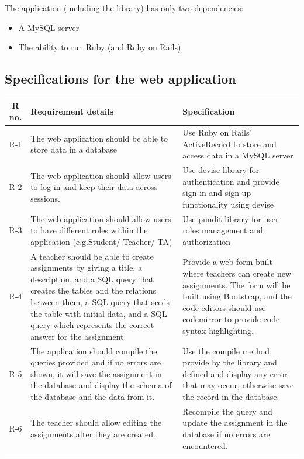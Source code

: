 The application (including the library) has only two dependencies:
\begin{itemize}
  \item A MySQL server
  \item The ability to run Ruby (and Ruby on Rails)
\end{itemize}

\subsection{Specifications for the web application}

\begin{tabularx}{\textwidth}{|c|Y|Y|}
  \hline
  \textbf{R no.} & \textbf{Requirement details} & \textbf{Specification} \\\hline
  \endhead
  R-1 & The web application should be able to store data in a database & Use Ruby on Rails' ActiveRecord to store and access data in a MySQL server \\\hline
  R-2 & The web application should allow users to log-in and keep their data across sessions. & Use devise library for authentication and provide sign-in and sign-up functionality using devise\\\hline
  R-3 &  The web application should allow users to have different roles within the application (e.g.Student/ Teacher/ TA) & Use pundit library for user roles management and authorization\\\hline
  R-4 &  A teacher should be able to create assignments by giving a title, a description, and a SQL query that creates the tables and the relations between them, a SQL query that seeds the table with initial data, and a SQL query which represents the correct answer for the assignment. & Provide a web form built where teachers can create new assignments. The form will be built using Bootstrap, and the code editors should use codemirror to provide code syntax highlighting. \\\hline
  R-5 &  The application should compile the queries provided and if no errors are shown, it will save the assignment in the database and display the schema of the database and the data from it. & Use the compile method provide by the library and defined and display any error that may occur, otherwise save the record in the database. \\\hline
  R-6 & The teacher should allow editing the assignments after they are created. & Recompile the query and update the assignment in the database if no errors are encountered. \\\hline

\end{tabularx}
